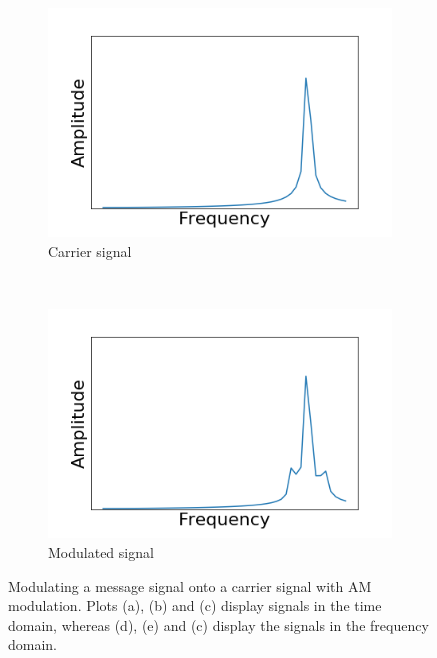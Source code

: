 \documentclass[]{article}
\begin{document}
\begin{figure}[h!]
	\begin{subfigure}[b]{0.3\textwidth}
		\includegraphics[width=\textwidth]{figs/amplitude_modulation/am/carrier_signal_freq.png}
		\caption{Carrier signal}
		\label{fig:am_carrier_signal_freq}
	\end{subfigure}
	~ %
	\begin{subfigure}[b]{0.3\textwidth}
		\includegraphics[width=\textwidth]{figs/amplitude_modulation/am/modulated_signal_freq.png}
		\caption{Modulated signal}
		\label{fig:am_modulated_signal_freq}
	\end{subfigure}
	\caption{Modulating a message signal onto a carrier signal with AM modulation. Plots (a), (b) and (c) display signals in the time domain, whereas (d), (e) and (c) display the signals in the frequency domain.}\label{fig:am_modulation}
\end{figure}
\end{document}
